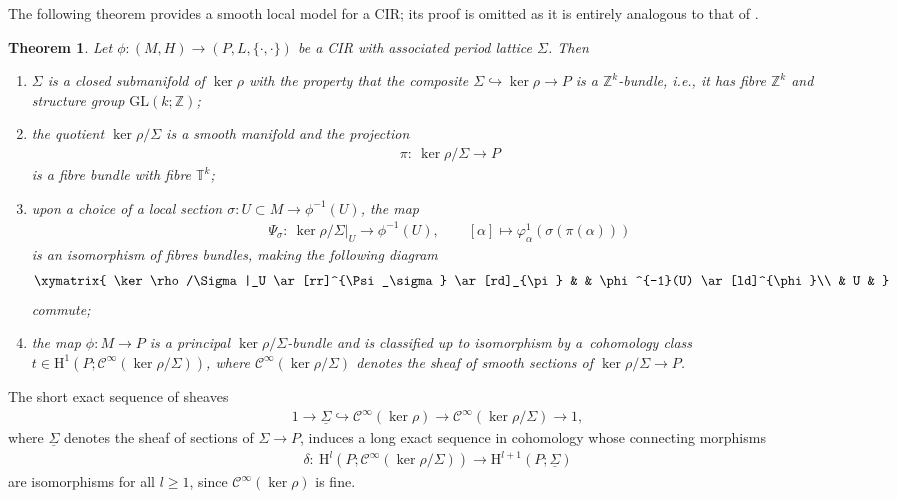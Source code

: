 \documentclass[pdftex]{sigma}
\numberwithin{equation}{section}
\newtheorem{Theorem}{Theorem}[section]
\newcommand{\JM}{(P,L,\{\cdot,\cdot\})} %
\newcommand{\CM}{(M,H)} %
\newcommand{\HH}{\mathrm{H}}
\newcommand{\ZZ}{\mathbb{Z}}
\begin{document}
The following theorem provides a smooth local model for a CIR; its proof is omitted as it is entirely analogous to that of \cite[Theorem~2.1]{dd}.

\begin{Theorem}\label{thm:local_model}
 Let $\phi\colon \CM\to\JM$ be a CIR with associated period lattice $\Sigma$. Then
 \begin{enumerate}[label={\rm (\Roman*)}, ref={\rm (\Roman*)}]\itemsep=0pt
 \item \label{item:1} $\Sigma$ is a closed submanifold of $\ker\rho$ with the property that the composite $\Sigma \hookrightarrow \ker \rho \to P$ is a $\ZZ^k$-bundle, i.e., it has fibre $\ZZ^k$ and structure group $\mathrm{GL}(k;\ZZ)$;
 \item \label{item:2} the quotient $\ker\rho/\Sigma$ is a smooth manifold and the projection
 \begin{gather*}
 \pi \colon \ \ker\rho/\Sigma \to P
 \end{gather*}
is a fibre bundle with fibre $\mathbb{T}^k$;
 \item \label{item:7} upon a choice of a local section $\sigma\colon U\subset M\to \phi^{-1}(U)$, the map
 \begin{gather}\label{eqn:local_isomorphism}
 \Psi_\sigma\colon \ \ker \rho/\Sigma|_U\to \phi^{-1}(U), \qquad [\alpha]\mapsto \varphi^1_{\alpha}(\sigma(\pi(\alpha)))
 \end{gather}
 is an isomorphism of fibres bundles, making the following diagram
 \begin{gather*}
 \xymatrix{
 \ker \rho/\Sigma|_U \ar[rr]^{\Psi_\sigma} \ar[rd]_{\pi} & & \phi^{-1}(U) \ar[ld]^{\phi}\\
 & U & }
 \end{gather*}
 commute;
 \item \label{item:18} the map $\phi \colon M \to P$ is a principal $\ker \rho/\Sigma$-bundle and is classified up to isomorphism by a~cohomology class $t \in \HH^1(P;\mathcal{C}^{\infty}(\ker \rho/\Sigma))$, where $\mathcal{C}^{\infty}(\ker \rho/\Sigma)$ denotes the sheaf of smooth sections of $\ker
 \rho/\Sigma \to P$.
 \end{enumerate}
\end{Theorem}

The short exact sequence of sheaves
\begin{gather*}
 1 \to \underline{\Sigma} \hookrightarrow \mathcal{C}^{\infty} (\ker \rho) \to \mathcal{C}^{\infty}(\ker \rho/\Sigma) \to 1,
\end{gather*}
where $ \underline{\Sigma}$ denotes the sheaf of sections of $\Sigma \to P$, induces a long exact sequence in cohomology whose connecting morphisms
\begin{gather*}
 \delta\colon \ \HH^{l}(P; \mathcal{C}^{\infty}(\ker \rho/\Sigma)) \to \HH^{l+1}(P;\underline{\Sigma})
\end{gather*}
are isomorphisms for all $l \geq 1$, since $\mathcal{C}^{\infty}(\ker \rho)$ is f\/ine.
\end{document}

